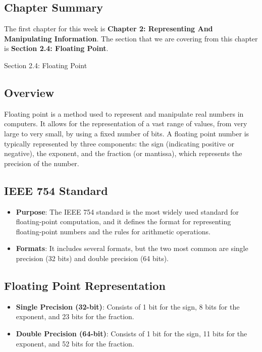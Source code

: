 \subsection{Chapter Summary}

The first chapter for this week is \textbf{Chapter 2: Representing And Manipulating Information}. The section that we are covering from this chapter is \textbf{Section 2.4: Floating Point}.

\begin{notes}{Section 2.4: Floating Point}
    \subsection*{Overview}

    Floating point is a method used to represent and manipulate real numbers in computers. It allows for the representation of a vast range of values, from very large to very small, by using a fixed 
    number of bits. A floating point number is typically represented by three components: the sign (indicating positive or negative), the exponent, and the fraction (or mantissa), which represents 
    the precision of the number. \vspace*{1em}

    \subsection*{IEEE 754 Standard}

    \begin{itemize}
        \item \textbf{Purpose}: The IEEE 754 standard is the most widely used standard for floating-point computation, and it defines the format for representing floating-point numbers and the rules 
        for arithmetic operations.
        \item \textbf{Formats}: It includes several formats, but the two most common are single precision (32 bits) and double precision (64 bits).
    \end{itemize}

    \subsection*{Floating Point Representation}

    \begin{itemize}
        \item \textbf{Single Precision (32-bit)}: Consists of 1 bit for the sign, 8 bits for the exponent, and 23 bits for the fraction.
        \item \textbf{Double Precision (64-bit)}: Consists of 1 bit for the sign, 11 bits for the exponent, and 52 bits for the fraction.
    \end{itemize}


\end{notes}
